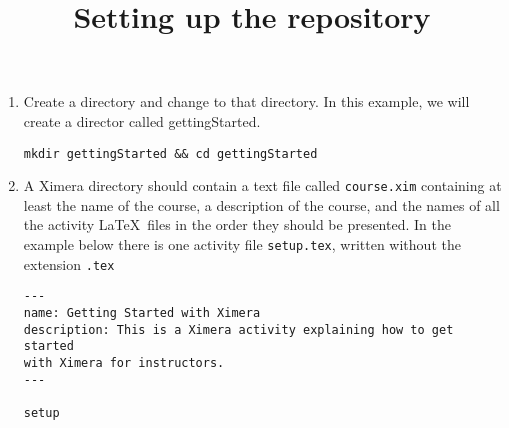 \documentclass{ximera}
\begin{document}
\title{Setting up the repository}
\begin{enumerate}
\item Create a directory and change to that directory.
In this example, we will create a director called gettingStarted.
\begin{center}
\begin{verbatim}
mkdir gettingStarted && cd gettingStarted
\end{verbatim}
\end{center}
\item A Ximera directory should contain
a text file called \verb!course.xim! containing
at least the name of the course, a description of the course,
and the names of all the activity \LaTeX\ files in the order
they should be presented. In the example below
there is one activity file \verb!setup.tex!,
written without the extension
\verb!.tex!
\begin{verbatim}
---
name: Getting Started with Ximera
description: This is a Ximera activity explaining how to get started
with Ximera for instructors.
---

setup
\end{verbatim}

\end{enumerate}
\end{document}
